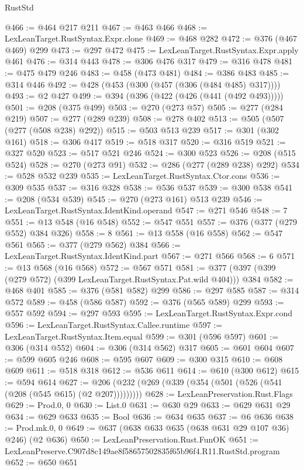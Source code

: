 \begin{lexlean}{RustStd}
\begin{coremodule}
@466 := @464 @217 @211
@467 := @463 @466
@468 := LexLeanTarget.RustSyntax.Expr.clone
@469 := @468 @282
@472 := @376 (@467 @469) @299
@473 := @297 @472
@475 := LexLeanTarget.RustSyntax.Expr.apply @461
@476 := @314 @443
@478 := @306 @476 @317
@479 := @316 @478
@481 := @475 @479 @246
@483 := @458 (@473 @481)
@484 := @386 @483
@485 := @314 @446
@492 := @428 (@453 (@300 (@457 (@306 (@484 @485) @317))))
@493 := @2 @427
@499 := @394 (@396 (@422 (@426 (@441 (@492 @493)))))
@501 := @208 (@375 @499)
@503 := @270 (@273 @57)
@505 := @277 (@284 @219)
@507 := @277 (@289 @239)
@508 := @278 @402
@513 := @505 (@507 (@277 (@508 @238) @292))
@515 := @503 @513 @239
@517 := @301 (@302 @161)
@518 := @306 @417
@519 := @518 @317
@520 := @316 @519
@521 := @327 @520
@523 := @517 @521 @246
@524 := @300 @523
@526 := @208 (@515 @524)
@528 := @270 (@273 @91)
@532 := @286 (@277 (@289 @238) @292)
@534 := @528 @532 @239
@535 := LexLeanTarget.RustSyntax.Ctor.cons
@536 := @309 @535
@537 := @316 @328
@538 := @536 @537
@539 := @300 @538
@541 := @208 (@534 @539)
@545 := @270 (@273 @161) @513 @239
@546 := LexLeanTarget.RustSyntax.IdentKind.operand
@547 := @271 @546
@548 := 7
@551 := @13 @548 (@16 @548)
@552 := @547 @551
@557 := @376 (@377 (@279 @552) @384 @326)
@558 := 8
@561 := @13 @558 (@16 @558)
@562 := @547 @561
@565 := @377 (@279 @562) @384
@566 := LexLeanTarget.RustSyntax.IdentKind.part
@567 := @271 @566
@568 := 6
@571 := @13 @568 (@16 @568)
@572 := @567 @571
@581 := @377 (@397 (@399 (@279 @572) (@399 LexLeanTarget.RustSyntax.Pat.wild @404))) @384
@582 := @468 @401
@585 := @376 (@581 @582) @299
@586 := @297 @585
@587 := @314 @572
@589 := @458 (@586 @587)
@592 := @376 (@565 @589) @299
@593 := @557 @592
@594 := @297 @593
@595 := LexLeanTarget.RustSyntax.Expr.cond
@596 := LexLeanTarget.RustSyntax.Callee.runtime
@597 := LexLeanTarget.RustSyntax.Item.equal
@599 := @301 (@596 @597)
@601 := @306 (@314 @552)
@604 := @306 (@314 @562) @317
@605 := @601 @604
@607 := @599 @605 @246
@608 := @595 @607
@609 := @300 @315
@610 := @608 @609
@611 := @518 @318
@612 := @536 @611
@614 := @610 (@300 @612)
@615 := @594 @614
@627 := @206 (@232 (@269 (@339 (@354 (@501 (@526 (@541 (@208 (@545 @615) (@2 @207)))))))))
@628 := LexLeanPreservation.Rust.Flags
@629 := Prod.{0, 0}
@630 := List.{0}
@631 := @630 @29
@633 := @629 @631 @29
@634 := @629 @633
@635 := Bool
@636 := @634 @635
@637 := @6 @636
@638 := Prod.mk.{0, 0}
@649 := @637 (@638 @633 @635 (@638 @631 @29 @107 @36) @246) (@2 @636)
@650 := LexLeanPreservation.Rust.FunOK
@651 := LexLeanPreserve.C907d8c149ae8f58657502835f65b96f4.R11.RustStd.program
@652 := @650 @651

\end{coremodule}
\end{lexlean}
